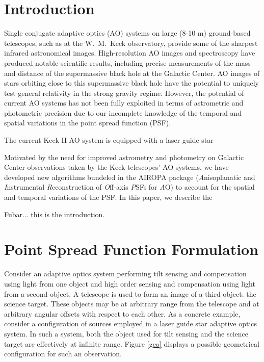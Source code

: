 \maketitle
\section{Introduction}

Single conjugate adaptive optics (AO) systems on large (8-10 m)
ground-based telescopes, such as at the W.~M.~Keck observatory,
provide some of the sharpest infrared astronomical images. 
High-resolution AO images and spectroscopy have produced 
notable scientific results, including precise measurements of the mass
and distance of the supermassive black hole at the Galactic Center. 
AO images of stars orbiting close to this supermassive black
hole have the potential to uniquely test general relativity in the strong
gravity regime. However, the potential of current AO systems has not been
fully exploited in terms of astrometric and photometric precision due
to our incomplete knowledge of the temporal and spatial variations in
the point spread function (PSF). 

The current Keck II AO system is equipped with a laser guide star 


Motivated by the need for improved
astrometry and photometry on Galactic Center observations taken by the
Keck telescopes' AO systems, we have developed new algorithms bundeled
in the AIROPA package ({\it A}nisoplanatic and {\it I}nstrumental {\it
  R}econstruction of {\it O}ff-axis {\it P}SFs for {\it A}O) to
account for the spatial and temporal variations of the PSF. 
In this paper, we describe the 


Fubar... this is the introduction. \cite{Britton:2006}

\section{Point Spread Function Formulation}
\label{sec:psfform}

Consider an adaptive optics system performing tilt sensing and
compensation using light from one object and high order sensing and
compensation using light from a second object.  A telescope is used to
form an image of a third object: the science target.  These objects
may be at arbitrary range from the telescope and at arbitrary angular
offsets with respect to each other.  As a concrete example, consider a
configuration of sources employed in a laser guide star adaptive
optics system.  In such a system, both the object used for tilt
sensing and the science target are effectively at infinite range.
Figure \ref{geo} displays a possible geometrical configuration for
such an observation.


